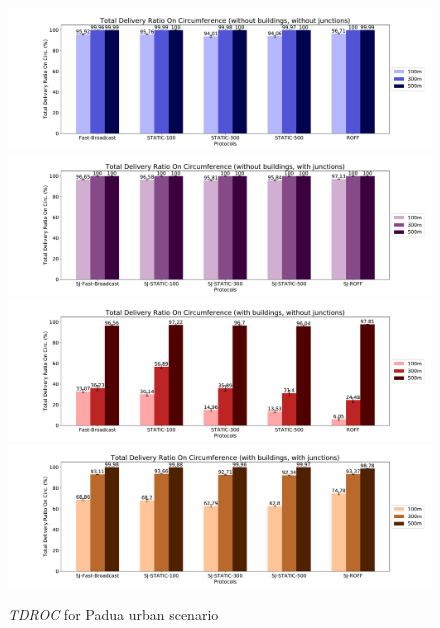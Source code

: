 		\begin{figure}[H]
			\centering
			\includegraphics[width=1.0\textwidth]{immagini/padua-25/b0/j0/tdroc}
			\includegraphics[width=1.0\textwidth]{immagini/padua-25/b0/j1/tdroc}
			\includegraphics[width=1.0\textwidth]{immagini/padua-25/b1/j0/tdroc}
			\includegraphics[width=1.0\textwidth]{immagini/padua-25/b1/j1/tdroc}
			\caption{\textit{TDROC} for Padua urban scenario}
			\label{fig:padua-25-tdroc}
		\end{figure}
		
